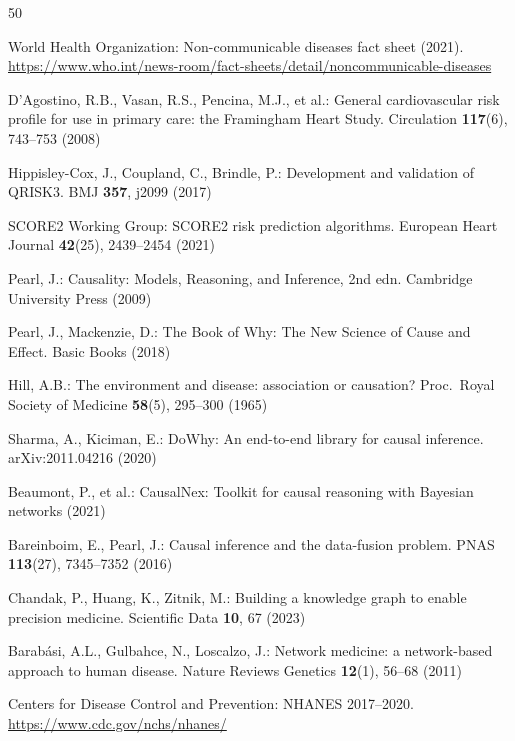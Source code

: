 \documentclass[runningheads]{llncs}
\begin{document}
\begin{thebibliography}{50}

World Health Organization:
Non-communicable diseases fact sheet (2021).
\url{https://www.who.int/news-room/fact-sheets/detail/noncommunicable-diseases}

D'Agostino, R.B., Vasan, R.S., Pencina, M.J., et al.:
General cardiovascular risk profile for use in primary care:
the Framingham Heart Study.
Circulation \textbf{117}(6), 743--753 (2008)

Hippisley-Cox, J., Coupland, C., Brindle, P.:
Development and validation of QRISK3.
BMJ \textbf{357}, j2099 (2017)

SCORE2 Working Group:
SCORE2 risk prediction algorithms.
European Heart Journal \textbf{42}(25), 2439--2454 (2021)

Pearl, J.:
Causality: Models, Reasoning, and Inference, 2nd edn.
Cambridge University Press (2009)

Pearl, J., Mackenzie, D.:
The Book of Why: The New Science of Cause and Effect.
Basic Books (2018)

Hill, A.B.:
The environment and disease: association or causation?
Proc.\ Royal Society of Medicine \textbf{58}(5), 295--300 (1965)

Sharma, A., Kiciman, E.:
DoWhy: An end-to-end library for causal inference.
arXiv:2011.04216 (2020)

Beaumont, P., et al.:
CausalNex: Toolkit for causal reasoning with Bayesian networks (2021)

Bareinboim, E., Pearl, J.:
Causal inference and the data-fusion problem.
PNAS \textbf{113}(27), 7345--7352 (2016)

Chandak, P., Huang, K., Zitnik, M.:
Building a knowledge graph to enable precision medicine.
Scientific Data \textbf{10}, 67 (2023)

Barab\'{a}si, A.L., Gulbahce, N., Loscalzo, J.:
Network medicine: a network-based approach to human disease.
Nature Reviews Genetics \textbf{12}(1), 56--68 (2011)

Centers for Disease Control and Prevention:
NHANES 2017--2020.
\url{https://www.cdc.gov/nchs/nhanes/}


\end{thebibliography}
\end{document}
